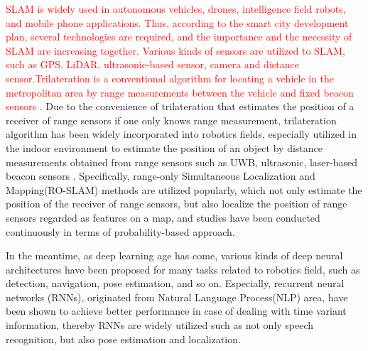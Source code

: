 \documentclass[letterpaper, 10 pt, conference]{ieeeconf}  %
\begin{document}
 
 \textcolor{red}{SLAM is widely used in autonomous vehicles, drones, intelligence field robots, and mobile phone applications. Thus, according to the smart city development plan, several technologies are required, and the importance and the necessity of SLAM are increasing together. Various kinds of sensors are utilized to SLAM, such as GPS, LiDAR, ultrasonic-based sensor, camera and distance sensor.Trilateration is a conventional algorithm for locating a vehicle in the metropolitan area by range measurements between the vehicle and fixed beacon sensors} \cite{staras1972accuracy}. Due to the convenience of trilateration that estimates the position of a receiver of range sensors if one only knows range measurement, trilateration algorithm has been widely incorporated into robotics fields, especially utilized in the indoor environment to estimate the position of an object by distance measurements obtained from range sensors such as UWB, ultrasonic, laser-based beacon sensors \cite{thomas2005revisiting, cho2010mobile,raghavan2010accurate}. Specifically, range-only Simultaneous Localization and Mapping(RO-SLAM) methods are utilized popularly, which not only estimate the position of the receiver of range sensors, but also localize the position of range sensors regarded as features on a map, and studies have been conducted continuously in terms of probability-based approach\cite{blanco2008pure, blanco2008efficient,fabresse2013undelayed, shetty2018particle}.
 
 In the meantime, as deep learning age has come\cite{lecun2015deep}, various kinds of deep neural architectures have been proposed for many tasks related to robotics field, such as detection\cite{lenz2015deep,cai2016unified, smith2018object}, navigation\cite{zhu2017target, hamandi2018deepmotion}, pose estimation\cite{walch2017image}, and so on. Especially, recurrent neural networks (RNNs), originated from Natural Language Process(NLP) area\cite{elman1990finding}, have been shown to achieve better performance in case of dealing with time variant information, thereby RNNs are widely utilized such as not only speech recognition, but also pose estimation and localization\cite{walch2017image, gladh2016deep, wang2017deepvo, kendall2015posenet, turan2018deep}. 
 
\end{document}

